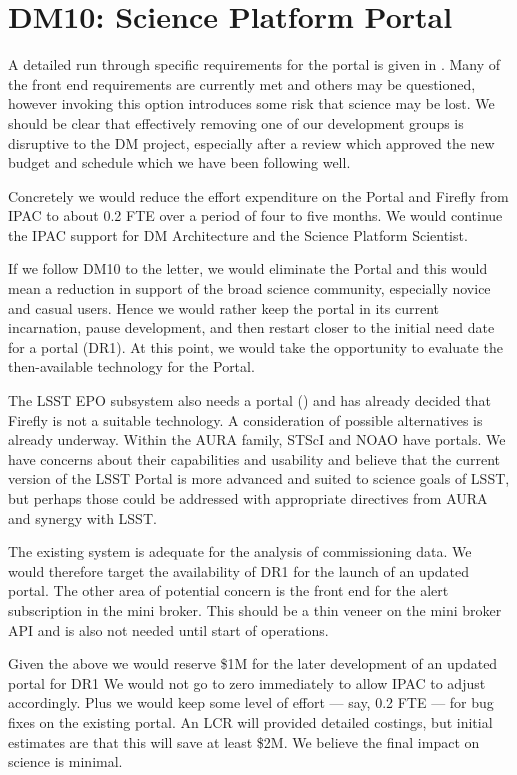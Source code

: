 \section{DM10: Science Platform Portal}\label{sect:dm10}

A detailed run through specific requirements for the portal is given in .
Many of the front end requirements are currently met and others may be questioned, however invoking this option introduces some risk that science may be lost.
We should be clear that effectively removing one of our development groups is disruptive to the DM project,
 especially after a
review which approved the new budget and schedule which we have been following well.

Concretely we would reduce the effort expenditure on the Portal and Firefly from IPAC to about 0.2 FTE over a period of four to five months.
We would continue the IPAC support for DM Architecture and the Science Platform Scientist.

If we follow DM10 to the letter, we would eliminate the Portal and this would mean a reduction in support of the broad science community,
especially novice and casual users.
Hence we would rather keep the portal in its current incarnation, pause development, and then restart closer
to the initial need date for a portal (DR1).
At this point, we would take the opportunity to evaluate the then-available technology for the Portal.

The LSST EPO subsystem also needs a portal ()  and has already decided that
Firefly is not a suitable technology. A consideration of possible alternatives
is already underway.
Within the AURA family, STScI and NOAO have portals.
We have concerns about their capabilities and usability
and believe that the current version of the LSST Portal is more advanced and suited to science goals of LSST,
but perhaps those could be addressed with appropriate directives from AURA and synergy with LSST.

The existing system is adequate for the analysis of commissioning data.
We would therefore target the availability of DR1 for the launch of an updated
portal.
The other area of potential concern is the front end for the alert subscription in the mini broker.
This should be a thin veneer on the mini broker API and is also not needed until start of operations.

Given the above we would reserve \$1M for the later development of an updated portal for DR1
We would not go to zero immediately to allow IPAC to adjust accordingly.
Plus we would keep some level of effort --- say, 0.2 FTE --- for bug fixes on the existing portal.
An LCR will provided detailed costings, but initial estimates are that this will save at least \$2M.
We believe the final impact on science is minimal.


